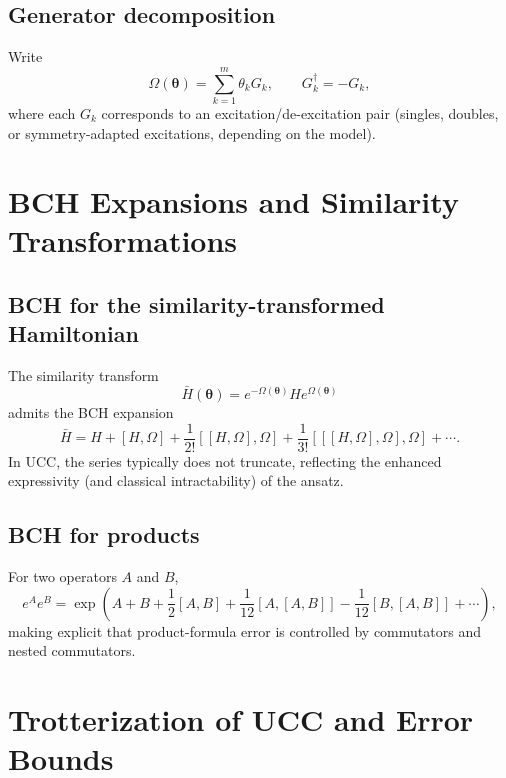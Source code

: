\documentclass[11pt]{article}
\begin{document}
\subsection{Generator decomposition}
Write
\begin{equation}
  \Omega(\bm{\theta})=\sum_{k=1}^{m}\theta_k G_k,\qquad G_k^\dagger=-G_k,
\end{equation}
where each $G_k$ corresponds to an excitation/de-excitation pair (singles, doubles, or
symmetry-adapted excitations, depending on the model).

\section{BCH Expansions and Similarity Transformations}

\subsection{BCH for the similarity-transformed Hamiltonian}
The similarity transform
\begin{equation}
  \bar{H}(\bm{\theta})=e^{-\Omega(\bm{\theta})}H e^{\Omega(\bm{\theta})}
\end{equation}
admits the BCH expansion
\begin{equation}
  \bar{H}=H+[H,\Omega]+\frac{1}{2!}[[H,\Omega],\Omega]
  +\frac{1}{3!}[[[H,\Omega],\Omega],\Omega]+\cdots .
  \label{eq:BCH}
\end{equation}
In UCC, the series typically does not truncate, reflecting the enhanced expressivity (and classical
intractability) of the ansatz.

\subsection{BCH for products}
For two operators $A$ and $B$,
\begin{equation}
  e^{A}e^{B}=\exp\!\left(A+B+\frac{1}{2}[A,B]+\frac{1}{12}[A,[A,B]]
  -\frac{1}{12}[B,[A,B]]+\cdots\right),
  \label{eq:BCH-product}
\end{equation}
making explicit that product-formula error is controlled by commutators and nested commutators.

\section{Trotterization of UCC and Error Bounds}
\end{document}
